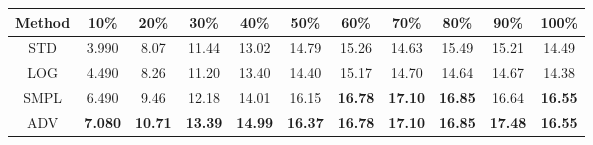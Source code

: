 \documentclass{standalone}
\begin{document}
\begin{tabular}{c|cccccccccc}
      \toprule
      Method & 10\% & 20\% & 30\% & 40\% & 50\% & 60\% & 70\% & 80\% & 90\% & 100\% \\
      \midrule
STD & 3.990 & 8.07 & 11.44 & 13.02 & 14.79 & 15.26 & 14.63 & 15.49 & 15.21 & 14.49\\
LOG & 4.490 & 8.26 & 11.20 & 13.40 & 14.40 & 15.17 & 14.70 & 14.64 & 14.67 & 14.38\\
SMPL & 6.490 & 9.46 & 12.18 & 14.01 & 16.15 & \textbf{16.78} & \textbf{17.10} & \textbf{16.85} & 16.64 & \textbf{16.55}\\
ADV & \textbf{7.080} & \textbf{10.71} & \textbf{13.39} & \textbf{14.99} & \textbf{16.37} & \textbf{16.78} & \textbf{17.10} & \textbf{16.85} & \textbf{17.48} & \textbf{16.55}\\
  \bottomrule
\end{tabular}
\end{document}
